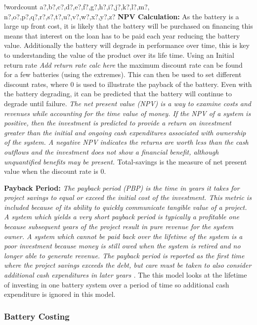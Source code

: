 \documentclass[fontsize=9.5pt]{extarticle}
\newcounter{words}
\newenvironment{counted}{%
  \setcounter{words}{0}
  \SearchList!{wordcount}{\stepcounter{words}}
    {a?,b?,c?,d?,e?,f?,g?,h?,i?,j?,k?,l?,m?,
    n?,o?,p?,q?,r?,s?,t?,u?,v?,w?,x?,y?,z?}
  \UndoBoundary{'}
  \SearchOrder{p;}}{%
  \StopSearching}
\begin{document}
\begin{counted}
\textbf{NPV Calculation:} As the battery is a large up front cost, it is
likely that the battery will be purchased on financing this means that
interest on the loan has to be paid each year reducing the battery
value. Additionally the battery will degrade in performance over time,
this is key to understanding the value of the product over its life
time. Using an Initial return rate \emph{Add return rate calc here} the
maximum discount rate can be found for a few batteries (using the
extremes). This can then be used to set different discount rates, where
0 is used to illustrate the payback of the battery. Even with the
battery degrading, it can be predicted that the battery will continue to
degrade until failure. \emph{The net present value (NPV) is a way to
examine costs and revenues while accounting for the time value of money.
If the NPV of a system is positive, then the investment is predicted to
provide a return on investment greater than the initial and ongoing cash
expenditures associated with ownership of the system. A negative NPV
indicates the returns are worth less than the cash outflows and the
investment does not show a financial benefit, although unquantified
benefits may be present. \cite{diorio2015economic}} Total-savings is the
measure of net present value when the discount rate is 0.

\textbf{Payback Period:} \emph{The payback period (PBP) is the time in
years it takes for project savings to equal or exceed the initial cost
of the investment. This metric is included because of its ability to
quickly communicate tangible value of a project. A system which yields a
very short payback period is typically a profitable one because
subsequent years of the project result in pure revenue for the system
owner. A system which cannot be paid back over the lifetime of the
system is a poor investment because money is still owed when the system
is retired and no longer able to generate revenue. The payback period is
reported as the first time where the project savings exceeds the debt,
but care must be taken to also consider additional cash expenditures in
later years \cite{diorio2015economic}.} The this model looks at the
lifetime of investing in one battery system over a period of time so
additional cash expenditure is ignored in this model.

\subsubsection{Battery Costing}\label{battery-costing}


\end{counted}
\end{document}
